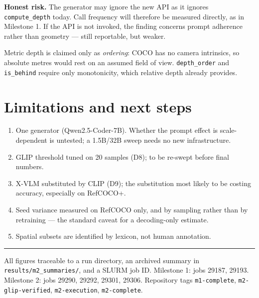 \documentclass[11pt,a4paper]{article}
\begin{document}
\textbf{Honest risk.} The generator may ignore the new API as it ignores
\texttt{compute\_depth} today. Call frequency will therefore be measured directly, as
in Milestone 1. If the API is not invoked, the finding concerns prompt adherence
rather than geometry --- still reportable, but weaker.

Metric depth is claimed only as \emph{ordering}: COCO has no camera intrinsics, so
absolute metres would rest on an assumed field of view. \texttt{depth\_order} and
\texttt{is\_behind} require only monotonicity, which relative depth already provides.

\section{Limitations and next steps}

\begin{enumerate}[leftmargin=1.3em, itemsep=2pt]
\item One generator (Qwen2.5-Coder-7B). Whether the prompt effect is scale-dependent
is untested; a 1.5B/32B sweep needs no new infrastructure.
\item GLIP threshold tuned on 20 samples (D8); to be re-swept before final numbers.
\item X-VLM substituted by CLIP (D9); the substitution most likely to be costing
accuracy, especially on RefCOCO+.
\item Seed variance measured on RefCOCO only, and by sampling rather than by
retraining --- the standard caveat for a decoding-only estimate.
\item Spatial subsets are identified by lexicon, not human annotation.
\end{enumerate}

\vspace{8pt}\hrule\vspace{3pt}
{\footnotesize\color{midgrey}
All figures traceable to a run directory, an archived summary in
\texttt{results/m2\_summaries/}, and a SLURM job ID. Milestone 1: jobs 29187, 29193.
Milestone 2: jobs 29290, 29292, 29301, 29306. Repository tags
\texttt{m1-complete}, \texttt{m2-glip-verified}, \texttt{m2-execution},
\texttt{m2-complete}.}
\end{document}
